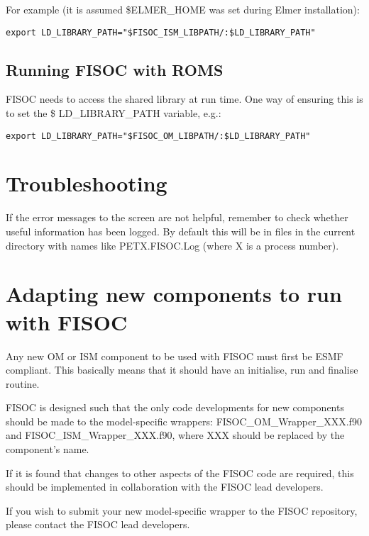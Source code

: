 \documentclass[12pt]{article}
\begin{document}
For example (it is assumed \$ELMER\_HOME was set during Elmer installation):
\begin{lstlisting}
export LD_LIBRARY_PATH="$FISOC_ISM_LIBPATH/:$LD_LIBRARY_PATH"
\end{lstlisting}


\subsection{Running FISOC with ROMS}
\label{sec:runningROMS}

FISOC needs to access the shared library at run time.  One way of ensuring this 
is to set the \$ LD\_LIBRARY\_PATH variable, e.g.:
\begin{lstlisting}
export LD_LIBRARY_PATH="$FISOC_OM_LIBPATH/:$LD_LIBRARY_PATH"
\end{lstlisting}

\section{Troubleshooting}

If the error messages to the screen are not helpful, remember to check whether useful 
information has been logged.  By default this will be in files in the current directory 
with names like PETX.FISOC.Log (where X is a process number).








\section{Adapting new components to run with  FISOC}
\label{sec:FISOC_SDG}

Any new OM or ISM component to be used with FISOC must first be ESMF compliant.  This basically 
means that it should have an initialise, run and finalise routine. 

FISOC is designed such that the only code developments for new components should be made to the 
model-specific wrappers: FISOC\_OM\_Wrapper\_XXX.f90 and FISOC\_ISM\_Wrapper\_XXX.f90, where 
XXX should be replaced by the component's name.

If it is found that changes to other aspects of the FISOC code are required, this should be 
implemented in collaboration with the FISOC lead developers.

If you wish to submit your new model-specific wrapper to the FISOC repository, please contact 
the FISOC lead developers.
\end{document}
